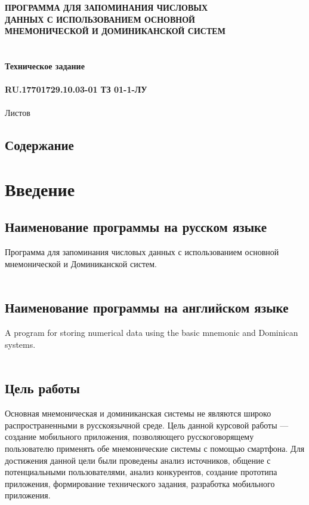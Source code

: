 \documentclass[draft]{article}
\begin{document}
\bigskip
\begin{center}
\topskip=0pt
\vspace*{\fill}
\textbf{ПРОГРАММА ДЛЯ ЗАПОМИНАНИЯ ЧИСЛОВЫХ\\
 ДАННЫХ С ИСПОЛЬЗОВАНИЕМ ОСНОВНОЙ\\
 МНЕМОНИЧЕСКОЙ И ДОМИНИКАНСКОЙ СИСТЕМ\\
~\\
~\\
Техническое задание\\
~\\
RU.17701729.10.03-01 ТЗ 01-1-ЛУ}\\
~\\
Листов \ztotpages\\
\vspace*{\fill}
\end{center}
\begin{center}
\vspace*{\fill}{
  Москва 2022}
\end{center}
\newpage
\begin{center}
\section {Содержание}
\tableofcontents
\end{center}
\newpage
\section {Введение}
\subsection{Наименование программы на русском языке}
Программа для запоминания числовых данных с использованием основной мнемонической и Доминиканской систем.\\
~\\
\subsection{Наименование программы на английском языке}
A program for storing numerical data using the basic mnemonic and Dominican systems.\\
~\\
\subsection{Цель работы}
Основная мнемоническая и доминиканская системы не являются широко распространенными в русскоязычной среде. Цель данной курсовой работы — создание мобильного приложения, позволяющего русскоговорящему пользователю применять обе мнемонические системы с помощью смартфона. Для достижения данной цели были проведены анализ источников, общение с потенциальными пользователями, анализ конкурентов, создание прототипа приложения, формирование технического задания, разработка мобильного приложения.\\
~\\
\end{document}
